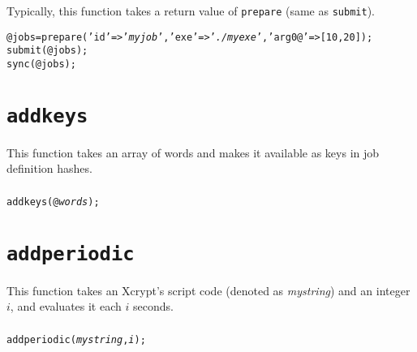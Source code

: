 \documentclass[a4paper,10pt]{report}
\begin{document}
\subsubsection{\example}

Typically, this function takes a return value of \texttt{prepare}
(same as \texttt{submit}).
\begin{boxnote}
\begin{alltt}
@jobs = prepare('id' => '\textit{myjob}', 'exe' => '\textit{./myexe}', 'arg0@' => [10,20]);
submit(@jobs);
sync(@jobs);
\end{alltt}
\end{boxnote}

\section{\texttt{addkeys}}

This function takes an array of words and makes it available as keys in job
definition hashes.

\subsubsection{\format}

\begin{boxnote}
\begin{alltt}
addkeys(@\textit{words});
\end{alltt}
\end{boxnote}
\vspace{\baselineskip}

\section{\texttt{addperiodic}}

This function takes an Xcrypt's script code (denoted as
\textit{mystring}) and an integer $i$, and evaluates it each $i$ seconds.

\subsubsection{\format}

\begin{boxnote}
\begin{alltt}
addperiodic(\textit{mystring}, \textit{i});
\end{alltt}
\end{boxnote}
\vspace{\baselineskip}
\end{document}
